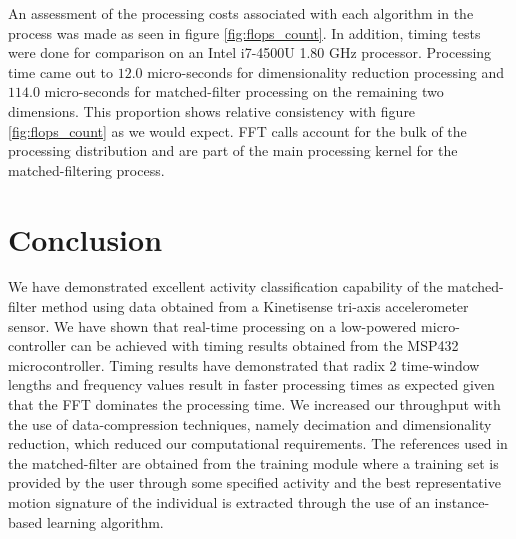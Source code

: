 \documentclass[conference]{IEEEtran}
\begin{document}
An assessment of the processing costs associated with each algorithm in the process was made as seen in figure \ref{fig:flops_count}.
In addition, timing tests were done for comparison on an Intel i7-4500U 1.80 GHz processor.
Processing time came out to $12.0$ micro-seconds for dimensionality reduction processing and $114.0$ micro-seconds for matched-filter processing on the remaining two dimensions.
This proportion shows relative consistency with figure \ref{fig:flops_count} as we would expect.
FFT calls account for the bulk of the processing distribution and are part of the main processing kernel for the matched-filtering process.
%
\section{Conclusion}
We have demonstrated excellent activity classification capability of the matched-filter method using data obtained from a Kinetisense tri-axis accelerometer sensor.
We have shown that real-time processing on a low-powered micro-controller can be achieved with timing results obtained from the MSP432 microcontroller.
Timing results have demonstrated that radix 2 time-window lengths and frequency values result in faster processing times as expected given that the FFT dominates the processing time.
We increased our throughput with the use of data-compression techniques, namely decimation and dimensionality reduction, which reduced our computational requirements.
The references used in the matched-filter are obtained from the training module where a training set is provided by the user through some specified activity and the best representative motion signature of the individual is extracted through the use of an instance-based learning algorithm.

%
\appendices
%
\ifCLASSOPTIONcaptionsoff
  \newpage
\fi
%


\end{document}
